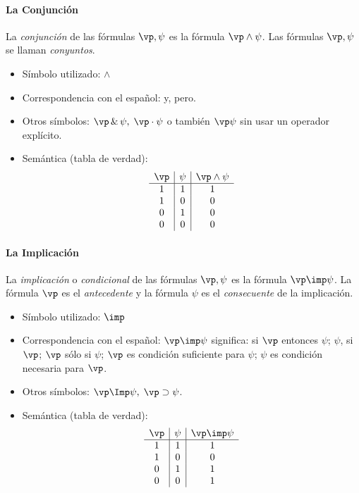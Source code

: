 \documentclass[11pt,letterpaper]{article}
\begin{document}
\paragraph{La Conjunci\'on}
La \emph{conjunci\'on} de las f\'ormulas $\vp,\psi$ es la f\'ormula
$\vp\land \psi$. Las f\'ormulas $\vp,\psi$ se llaman 
\emph{conyuntos}. 

\begin{itemize}
 \item S\'imbolo utilizado: $\land$
 \item Correspondencia con el espa\~nol: y, pero. 
 \item Otros s\'imbolos: $\vp\,\&\, \psi,\;\vp\cdot \psi$ o tambi\'en $\vp\psi$ 
  sin usar un operador expl\'icito.
 \item Sem\'antica (tabla de verdad): 
  \[
   \begin{array}{c|c|c}
    \vp & \psi & \vp\land \psi\\ \hline 
    1 & 1 & 1\\
    1 & 0 & 0\\
    0 & 1 & 0\\
    0 & 0 & 0\\
   \end{array}
  \]
\end{itemize}


\paragraph{La Implicaci\'on}
La \emph{implicaci\'on} o \emph{condicional} de las f\'ormulas $\vp,\psi$ es la 
f\'ormula $\vp\imp \psi$. 
La f\'ormula $\vp$ es el \emph{antecedente} y la
f\'ormula $\psi$ es el \emph{consecuente} de la implicaci\'on. 

\begin{itemize}
 \item S\'imbolo utilizado: $\imp$
 \item Correspondencia con el espa\~nol: $\vp\imp \psi$ significa: si $\vp$
  entonces $\psi$; $\psi$, si $\vp$; $\vp$ s\'olo si $\psi$; $\vp$ es 
  condici\'on suficiente para $\psi$; $\psi$ es condici\'on necesaria para 
  $\vp$.
 \item Otros s\'imbolos: $\vp\Imp \psi,\;\vp\supset \psi$.
 \item Sem\'antica (tabla de verdad): 
  \[
   \begin{array}{c|c|c}
    \vp & \psi & \vp\imp \psi\\\hline 
    1 & 1 & 1\\
    1 & 0 & 0\\
    0 & 1 & 1\\
    0 & 0 & 1\\
   \end{array}
  \]
\end{itemize}
\end{document}
